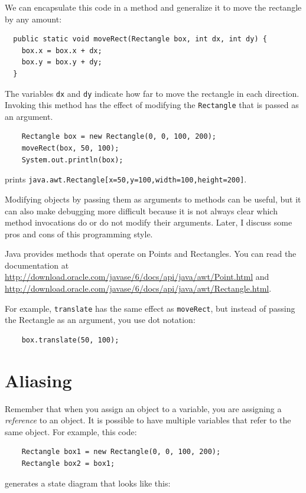 \documentclass[12pt]{book}
\theoremstyle{exercise}
\begin{document}

We can encapsulate this code in a method and
generalize it to move the rectangle by any amount:

\begin{lstlisting}
  public static void moveRect(Rectangle box, int dx, int dy) {
    box.x = box.x + dx;
    box.y = box.y + dy;
  }
\end{lstlisting}
%
The variables {\tt dx} and {\tt dy} indicate how far to move the
rectangle in each direction.  Invoking this method has the effect of
modifying the {\tt Rectangle} that is passed as an argument.

\begin{lstlisting}
    Rectangle box = new Rectangle(0, 0, 100, 200);
    moveRect(box, 50, 100);
    System.out.println(box);
\end{lstlisting}
%
prints {\tt java.awt.Rectangle[x=50,y=100,width=100,height=200]}.

Modifying objects by passing them as arguments to methods can be
useful, but it can also make debugging more difficult because it is
not always clear which method invocations do or do not modify their
arguments.  Later, I discuss some pros and cons of this
programming style.

Java provides methods that operate on Points and Rectangles.  You can
read the documentation at
\url{http://download.oracle.com/javase/6/docs/api/java/awt/Point.html}
and
\url{http://download.oracle.com/javase/6/docs/api/java/awt/Rectangle.html}.

For example, {\tt translate} has the same effect as {\tt moveRect},
but instead of passing the Rectangle as an argument, you use dot
notation:

\begin{lstlisting}
    box.translate(50, 100);
\end{lstlisting}
%


\section{Aliasing}
\label{aliasing}

Remember that when you assign an object to a variable, you
are assigning a {\em reference} to an object.  It is possible to have
multiple variables that refer to the same object.  For example,
this code:

\begin{lstlisting}
    Rectangle box1 = new Rectangle(0, 0, 100, 200);
    Rectangle box2 = box1;
\end{lstlisting}
%
generates a state diagram that looks like this:
\end{document}
